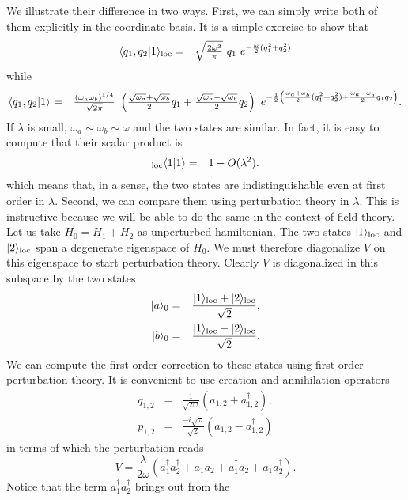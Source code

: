 \documentclass[10pt, nofootinbib]{revtex4}
\newcommand{\bea}{\begin{eqnarray}}
\newcommand{\eea}{\end{eqnarray}}
\begin{document}
We illustrate their difference in two ways.  First, we can simply
write both of them explicitly in the coordinate basis.  It is a simple
exercise to show that
%
\bea 
\langle q_{1},q_{2}|1\rangle_{\rm loc} &=& 
{\textstyle{\sqrt{\frac{2\omega^3}{\pi}}}}\  q_{1}\ e^{ -
\frac{\omega}{2}(q_1^2+q_2^2) } 
\label{1loc11}
\eea
%
while
%
\bea
\langle q_{1},q_{2}|1\rangle_{\rm } &=& 
\textstyle{\frac{(\omega_a \omega_b)^{1/4}}{\sqrt{2\pi}} }
\ \left( \frac{\sqrt{\omega_a}+\sqrt{\omega_b}}{2}
q_{1}+ \frac{\sqrt{\omega_a}-\sqrt{\omega_b}}{2}q_{2}
\right)
\ e^{-\frac{1}{2}\left(\frac{\omega_{a}+\omega_{b}}{2}(q_{1}^2+q_{2}^2)
+\frac{\omega_{a}-\omega_{b}}{2} q_{1}q_{2}\right)}.
\label{1glo11}
\eea
%
If $\lambda$ is small, $\omega_{a}\sim\omega_{b}\sim\omega$ and the
two states are similar.  In fact, it is easy to compute that their
scalar product is
%
\bea
{}_{\rm loc}\langle 1|1\rangle &=& 1 
- O(\lambda^2). 
\label{ss}
\eea
%
which means that, in a sense, the two states are indistinguishable
even at first order in $\lambda$.  Second, we can compare them using
perturbation theory in $\lambda$.  This is instructive because we will
be able to do the same in the context of field theory.  Let us take
$H_{0}=H_{1}+H_{2}$ as unperturbed hamiltonian.  The two states
$|1\rangle_{\rm loc}$ and $|2\rangle_{\rm loc}$ span a degenerate 
eigenspace of $H_{0}$. We must therefore diagonalize $V$ on this 
eigenspace to start perturbation theory. Clearly $V$ is diagonalized 
in this subspace by the two states 
\begin{eqnarray} 
|a\rangle_{0} &=& \frac{|1\rangle_{\rm loc}+|2\rangle_{\rm loc}}{\sqrt 
2} , \\
|b\rangle_{0} &=& \frac{|1\rangle_{\rm loc}-|2\rangle_{\rm loc}}{\sqrt 
2}.  
\end{eqnarray}
We can compute the first order correction to these states using first 
order perturbation theory. It is convenient to use creation and 
annihilation operators 
\begin{eqnarray} 
q_{1,2} &=& \frac{1}{\sqrt{2\omega}}
(a_{1,2}+ a^\dagger_{1,2}),
\\
p_{1,2} &=& \frac{-i\sqrt{\omega}}{\sqrt{2}}
(a_{1,2}-a^\dagger_{1,2})
\end{eqnarray}
in terms of which the perturbation reads
\begin{equation}
V = \frac{\lambda}{2\omega} (a^\dagger_{1}a^\dagger_{2}+a_{1}a_{2}
+a^\dagger_{1}a_{2}+a_{1}a^\dagger_{2}). 
\end{equation}
Notice that the term $a^\dagger_{1}a^\dagger_{2}$ brings out from the
\end{document}
